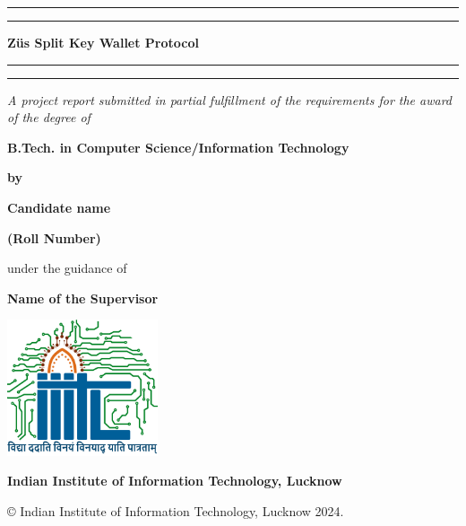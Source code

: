 \thispagestyle{empty}

\setcounter{page}{1}

\def\thepage{\roman{page}}

\begin{center}

    \rule[0.5ex]{\linewidth}{2pt}\vspace*{-\baselineskip}\vspace*{3.2pt}
    \rule[0.5ex]{\linewidth}{2pt}
    
    \vspace*{3.2pt}

    {\Large\bf Züs Split Key Wallet Protocol}

    \vspace*{3.2pt}
    
    \rule[0.5ex]{\linewidth}{2pt}\vspace*{-\baselineskip}\vspace*{3.2pt}
    \rule[0.5ex]{\linewidth}{2pt}
    
    \vspace{1.5cm}
    
    \textit{{A project report submitted in partial fulfillment of the requirements 
    for the award of the degree of}}
    
    \vspace{1cm}
    
    {\bf B.Tech. in Computer Science/Information Technology}
    
    \vspace{1cm}
    
    {\bf by}
    
    \vspace{0.8cm}
    
    {\bf {Candidate name}}
    
    \vspace{0.1cm}
    
    {\bf {(Roll Number)}}
    
    \vspace{1.8cm}
    
    {under the guidance of}
    
    \vspace{0.1cm}

        {\bf{Name of the Supervisor}}

    
    \vspace{1.8cm}
    
    \includegraphics[height=4cm]{./Images/Logo_IIITL.png}
    
    \vspace{.5cm}
    {\bf\large{Indian Institute of Information Technology, Lucknow}}\\
    {\bf{}}
\end{center}

\medskip

\centerline{ \copyright{} Indian Institute of Information Technology, Lucknow 2024.}

\cleardoublepage






